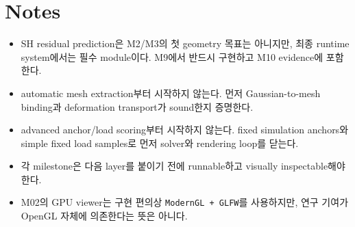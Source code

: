 \documentclass[10pt]{article}
\newcommand{\code}[1]{\texttt{#1}}
\begin{document}
\section*{Notes}

\begin{itemize}
  \item SH residual prediction은 M2/M3의 첫 geometry 목표는 아니지만, 최종 runtime system에서는 필수 module이다. M9에서 반드시 구현하고 M10 evidence에 포함한다.
  \item automatic mesh extraction부터 시작하지 않는다. 먼저 Gaussian-to-mesh binding과 deformation transport가 sound한지 증명한다.
  \item advanced anchor/load scoring부터 시작하지 않는다. fixed simulation anchors와 simple fixed load samples로 먼저 solver와 rendering loop를 닫는다.
  \item 각 milestone은 다음 layer를 붙이기 전에 runnable하고 visually inspectable해야 한다.
  \item M02의 GPU viewer는 구현 편의상 \code{ModernGL + GLFW}를 사용하지만, 연구 기여가 OpenGL 자체에 의존한다는 뜻은 아니다.
\end{itemize}
\end{document}
